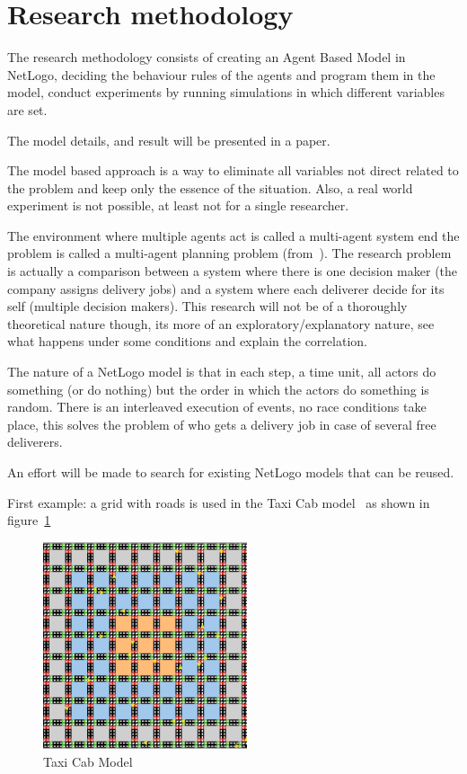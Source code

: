 \documentclass{article}
\begin{document}


    \section{Research methodology}
    The research methodology consists of creating an Agent Based Model in NetLogo, deciding the behaviour rules of the agents and program them in the model, conduct
    experiments by running simulations in which different variables are set.

    The model details, and result will be presented in a paper.

    The model based approach is a way to eliminate all variables not direct related to the problem and keep only the essence of the situation.
    Also, a real world experiment is not possible, at least not for a single researcher.

    The environment where multiple agents act is called a multi-agent system end the problem is called a multi-agent planning problem (from~\cite{russell2016artificial}).
    The research problem is actually a comparison between a system where there is one decision maker (the company assigns delivery jobs) and a system where each deliverer decide for its self (multiple decision makers).
    This research will not be of a thoroughly theoretical nature though, its more of an exploratory/explanatory nature, see what happens under some conditions and explain the correlation.

    The nature of a NetLogo model is that in each step, a time unit, all actors do something (or do nothing) but the order in which the actors do something is random.
    There is an interleaved execution of events, no race conditions take place, this solves the problem of who gets a delivery job in case of several free deliverers.

    An effort will be made to search for existing NetLogo models that can be reused.

    First example: a grid with roads is used in the Taxi Cab model~\cite{dongpingtaxicabs2019} as shown in figure~\ref{fig:taxi cab}
    \begin{figure}
        \centering
        \includegraphics[width=6cm]{pics/Taxi Cabs}
        \caption{Taxi Cab Model}
        \label{fig:taxi cab}
    \end{figure}
\end{document}
